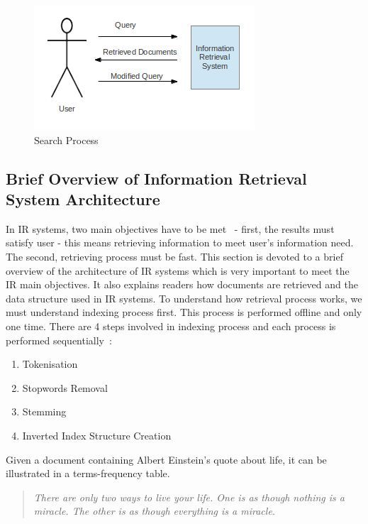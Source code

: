 \begin{figure}
\centering
\includegraphics[scale=1]{./figures/retrieval_process.png}
\caption{Search Process} \label{fig:retrieval_process}
\end{figure}

\subsection{Brief Overview of Information Retrieval System Architecture}\label{section:IRarchitecture}
In IR systems, two main objectives have to be met~\cite{IRarchitecture} - first, the results must satisfy user - this means retrieving information to meet user's
information need. The second, retrieving process must be fast. This section is devoted to a brief overview of the architecture of IR systems 
which is very important to meet the IR main objectives. It also explains readers
how documents are retrieved and the data structure used in IR systems. To understand how retrieval process works, we must understand 
indexing process first. This process is performed offline and only one time. 
There are 4 steps involved in indexing process and each process is performed sequentially~\cite{IRarchitecture}:
\begin{enumerate}
 \item Tokenisation
 \item Stopwords Removal
 \item Stemming
 \item Inverted Index Structure Creation
\end{enumerate}

Given a document containing Albert Einstein's quote about life, it can be illustrated in a terms-frequency table.

\begin{quotation}
 \item \textit{There are only two ways to live your life. One is as though nothing is a miracle. The other is as though everything is a miracle.}
\end{quotation}


